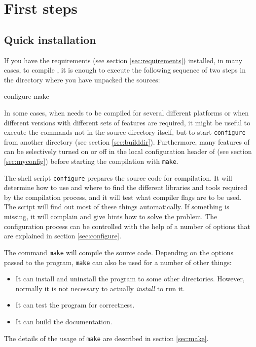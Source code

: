 \chapter{First steps}
\label{chap:firststeps}

\section{Quick installation}


If you have the requirements (see section \vref{sec:requirements})
installed, in many cases, to compile \es{}, it is enough to execute
the following sequence of two steps in the directory where you have
unpacked the sources:
\begin{code}
configure
make
\end{code}

In some cases, \eg{} when \es{} needs to be compiled for several
different platforms or when different versions with different sets of
features are required, it might be useful to execute the commands not
in the source directory itself, but to start \texttt{configure} from
another directory (see section \vref{sec:builddir}). Furthermore, many
features of \es{} can be selectively turned on or off in the local
configuration header of \es{} (see section \vref{sec:myconfig}) before
starting the compilation with \texttt{make}.

The shell script \texttt{configure} prepares the source code for
compilation. It will determine how to use and where to find the
different libraries and tools required by the compilation process, and
it will test what compiler flags are to be used.  The script will find
out most of these things automatically.  If something is missing, it
will complain and give hints how to solve the problem.  The
configuration process can be controlled with the help of a number of
options that are explained in section \vref{sec:configure}.

The command \texttt{make} will compile the source code. Depending on
the options passed to the program, \texttt{make} can also be used for
a number of other things:
\begin{itemize}
\item It can install and uninstall the program to some other
  directories. However, normally it is not necessary to actually
  \textit{install} \es{} to run it.
\item It can test the \es{} program for correctness.
\item It can build the documentation.
\end{itemize}
The details of the usage of \texttt{make} are described in section
\vref{sec:make}.

